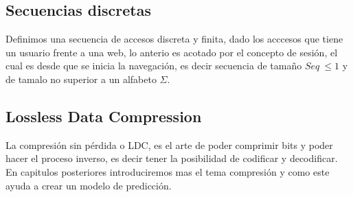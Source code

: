 


\subsection{Secuencias discretas}

Definimos una secuencia de accesos discreta y finita, dado los acccesos que tiene un usuario frente a una web, lo anterio es acotado por el concepto de sesión, el cual es desde que se inicia la navegación, es decir secuencia de tamaño $Seq\ \leq 1$ y de tamalo no superior a un alfabeto $\Sigma$.





\subsection{Lossless Data Compression}

La compresión sin pérdida o LDC, es el arte de poder comprimir bits y poder hacer el proceso inverso, es decir tener la posibilidad de codificar y decodificar. En capitulos posteriores introduciremos mas el tema compresión y como este ayuda a crear un modelo de predicción.





